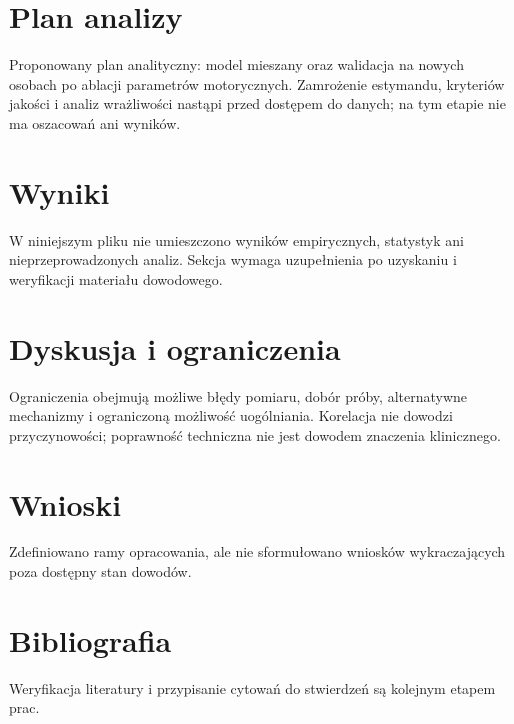 \documentclass[11pt,a4paper]{article}
\begin{document}
\section{Plan analizy}

Proponowany plan analityczny: model mieszany oraz walidacja na nowych osobach po ablacji parametrów motorycznych. Zamrożenie estymandu, kryteriów jakości i analiz wrażliwości nastąpi przed dostępem do danych; na tym etapie nie ma oszacowań ani wyników.

\section{Wyniki}

W niniejszym pliku nie umieszczono wyników empirycznych, statystyk ani nieprzeprowadzonych analiz. Sekcja wymaga uzupełnienia po uzyskaniu i weryfikacji materiału dowodowego.

\section{Dyskusja i ograniczenia}

Ograniczenia obejmują możliwe błędy pomiaru, dobór próby, alternatywne mechanizmy i ograniczoną możliwość uogólniania. Korelacja nie dowodzi przyczynowości; poprawność techniczna nie jest dowodem znaczenia klinicznego.

\section{Wnioski}

Zdefiniowano ramy opracowania, ale nie sformułowano wniosków wykraczających poza dostępny stan dowodów.

\section*{Bibliografia}

Weryfikacja literatury i przypisanie cytowań do stwierdzeń są kolejnym etapem prac.
\end{document}
